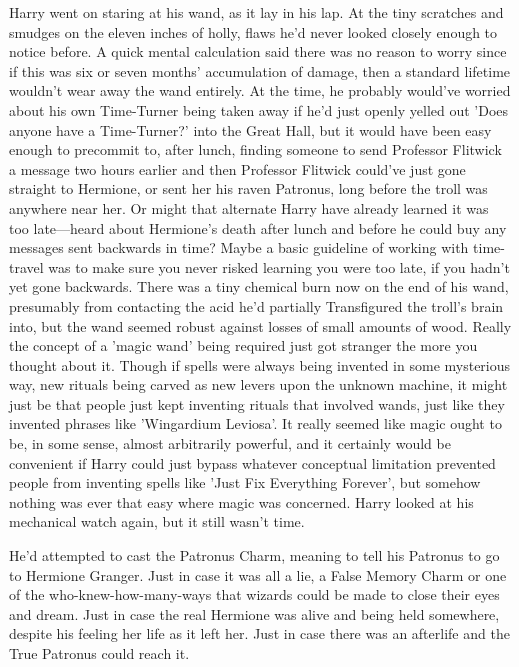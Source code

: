 Harry went on staring at his wand, as it lay in his lap. At the tiny scratches 
and smudges on the eleven inches of holly, flaws he'd never looked closely 
enough to notice before. A quick mental calculation said there was no reason to 
worry since if this was six or seven months' accumulation of damage, then a 
standard lifetime wouldn't wear away the wand entirely. At the time, he 
probably would've worried about his own Time-Turner being taken away if he'd 
just openly yelled out 'Does anyone have a Time-Turner?' into the Great Hall, 
but it would have been easy enough to precommit to, after lunch, finding 
someone to send Professor Flitwick a message two hours earlier and then 
Professor Flitwick could've just gone straight to Hermione, or sent her his 
raven Patronus, long before the troll was anywhere near her. Or might that 
alternate Harry have already learned it was too late---heard about Hermione's 
death after lunch and before he could buy any messages sent backwards in time? 
Maybe a basic guideline of working with time-travel was to make sure you never 
risked learning you were too late, if you hadn't yet gone backwards. There was 
a tiny chemical burn now on the end of his wand, presumably from contacting the 
acid he'd partially Transfigured the troll's brain into, but the wand seemed 
robust against losses of small amounts of wood. Really the concept of a 'magic 
wand' being required just got stranger the more you thought about it. Though if 
spells were always being invented in some mysterious way, new rituals being 
carved as new levers upon the unknown machine, it might just be that people 
just kept inventing rituals that involved wands, just like they invented 
phrases like 'Wingardium Leviosa'. It really seemed like magic ought to be, in 
some sense, almost arbitrarily powerful, and it certainly would be convenient 
if Harry could just bypass whatever conceptual limitation prevented people from 
inventing spells like 'Just Fix Everything Forever', but somehow nothing was 
ever that easy where magic was concerned. Harry looked at his mechanical watch 
again, but it still wasn't time.

He'd attempted to cast the Patronus Charm, meaning to tell his Patronus to go 
to Hermione Granger. Just in case it was all a lie, a False Memory Charm or one 
of the who-knew-how-many-ways that wizards could be made to close their eyes 
and dream. Just in case the real Hermione was alive and being held somewhere, 
despite his feeling her life as it left her. Just in case there was an 
afterlife and the True Patronus could reach it.

